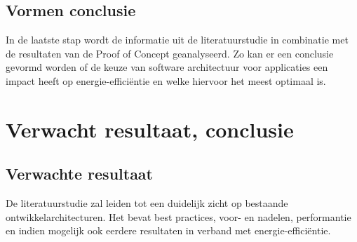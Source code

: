 \subsection{Vormen conclusie}
In de laatste stap wordt de informatie uit de literatuurstudie in combinatie met de resultaten van de Proof of Concept geanalyseerd. Zo kan er een conclusie gevormd worden of de keuze van software architectuur voor applicaties een impact heeft op energie-efficiëntie en welke hiervoor het meest optimaal is.

%
%
%
%
%

\section{Verwacht resultaat, conclusie}%
\label{sec:verwachte_resultaten}
\subsection{Verwachte resultaat}
De literatuurstudie zal leiden tot een duidelijk zicht op bestaande ontwikkelarchitecturen. Het bevat best practices, voor- en nadelen, performantie en indien mogelijk ook eerdere resultaten in verband met energie-efficiëntie.

